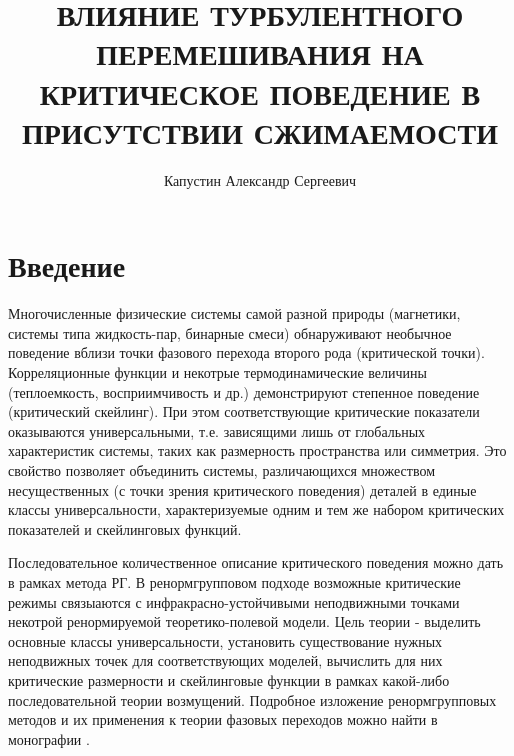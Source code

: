 \documentclass []{rusthesis} %
\title{ВЛИЯНИЕ ТУРБУЛЕНТНОГО ПЕРЕМЕШИВАНИЯ НА КРИТИЧЕСКОЕ ПОВЕДЕНИЕ В ПРИСУТСТВИИ СЖИМАЕМОСТИ}
\author{Капустин Александр Сергеевич}
\date{}
\begin{document}
\maketitle


\chapter*{Введение}			%
\markboth{}{}				%

Многочисленные физические системы самой разной природы (магнетики, системы типа жидкость-пар, бинарные смеси) обнаруживают необычное поведение вблизи точки фазового перехода второго рода (критической точки). Корреляционные функции и некотрые термодинамические величины (теплоемкость, восприимчивость и др.) демонстрируют степенное поведение (критический скейлинг). При этом соответствующие критические показатели оказываются универсальными, т.е. зависящими лишь от глобальных характеристик системы, таких как размерность пространства или симметрия. Это свойство позволяет объединить системы, различающихся множеством несущественных (с точки зрения критического поведения) деталей в единые классы универсальности, характеризуемые одним и тем же набором критических показателей и скейлинговых функций.

Последовательное количественное описание критического поведения можно дать в рамках метода РГ. В ренормгрупповом подходе возможные критические режимы связыаются с инфракрасно-устойчивыми  неподвижными точками некотрой ренормируемой теоретико-полевой модели. Цель теории - выделить основные классы универсальности, установить существование нужных неподвижных точек для соответствующих моделей, вычислить для них критические размерности и скейлинговые функции в рамках какой-либо последовательной теории возмущений. Подробное изложение ренормгрупповых методов и их применения к теории фазовых переходов можно найти в монографии \cite{Zinn}.
\end{document}
